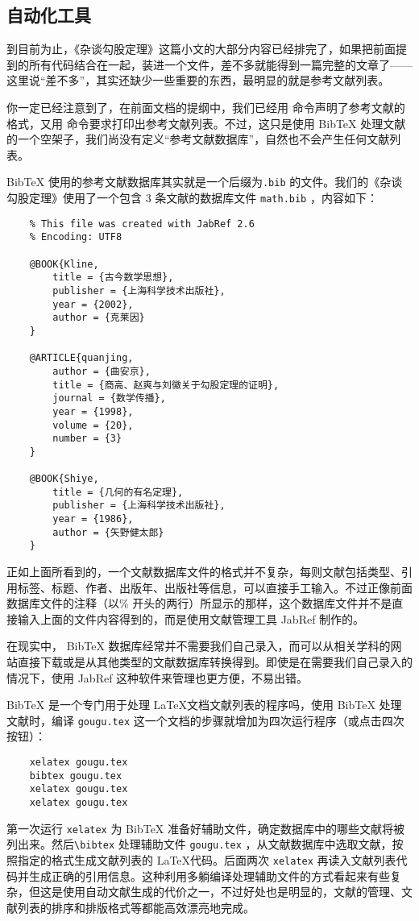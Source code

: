 \subsection{自动化工具}

到目前为止，《杂谈勾股定理》这篇小文的大部分内容已经排完了，如果把前面提到的所有代码结合在一起，装进一个文件，差不多就能得到一篇完整的文章了——这里说“差不多”，其实还缺少一些重要的东西，最明显的就是参考文献列表。

你一定已经注意到了，在前面文档的提纲中，我们已经用\verb|| 命令声明了参考文献的格式，又用\verb|| 命令要求打印出参考文献列表。不过，这只是使用 BibTeX 处理文献的一个空架子，我们尚没有定义“参考文献数据库”，自然也不会产生任何文献列表。

BibTeX 使用的参考文献数据库其实就是一个后缀为\verb|.bib| 的文件。我们的《杂谈勾股定理》使用了一个包含 3 条文献的数据库文件 \verb|math.bib| ，内容如下：
\begin{lstlisting}
    % This file was created with JabRef 2.6
    % Encoding: UTF8

    @BOOK{Kline,
        title = {古今数学思想},
        publisher = {上海科学技术出版社},
        year = {2002},
        author = {克莱因}
    }

    @ARTICLE{quanjing,
        author = {曲安京},
        title = {商高、赵爽与刘徽关于勾股定理的证明},
        journal = {数学传播},
        year = {1998},
        volume = {20},
        number = {3}
    }

    @BOOK{Shiye,
        title = {几何的有名定理},
        publisher = {上海科学技术出版社},
        year = {1986},
        author = {矢野健太郎}
    }
\end{lstlisting}

正如上面所看到的，一个文献数据库文件的格式并不复杂，每则文献包括类型、引用标签、标题、作者、出版年、出版社等信息，可以直接手工输入。不过正像前面数据库文件的注释（以\% 开头的两行）所显示的那样，这个数据库文件并不是直接输入上面的文件内容得到的，而是使用文献管理工具 JabRef 制作的。

在现实中， BibTeX 数据库经常并不需要我们自己录入，而可以从相关学科的网站直接下载或是从其他类型的文献数据库转换得到。即使是在需要我们自己录入的情况下，使用 JabRef 这种软件来管理也更方便，不易出错。

BibTeX 是一个专门用于处理 \LaTeX 文档文献列表的程序吗，使用 BibTeX 处理文献时，编译 \verb|gougu.tex| 这一个文档的步骤就增加为四次运行程序（或点击四次按钮）：
\begin{lstlisting}
    xelatex gougu.tex  
    bibtex gougu.tex  
    xelatex gougu.tex  
    xelatex gougu.tex
\end{lstlisting}
第一次运行 \verb|xelatex| 为 BibTeX 准备好辅助文件，确定数据库中的哪些文献将被列出来。然后\verb|\bibtex| 处理辅助文件 \verb|gougu.tex| ，从文献数据库中选取文献，按照指定的格式生成文献列表的 \LaTeX 代码。后面两次 \verb|xelatex| 再读入文献列表代码并生成正确的引用信息。这种利用多躺编译处理辅助文件的方式看起来有些复杂，但这是使用自动文献生成的代价之一，不过好处也是明显的，文献的管理、文献列表的排序和排版格式等都能高效漂亮地完成。

